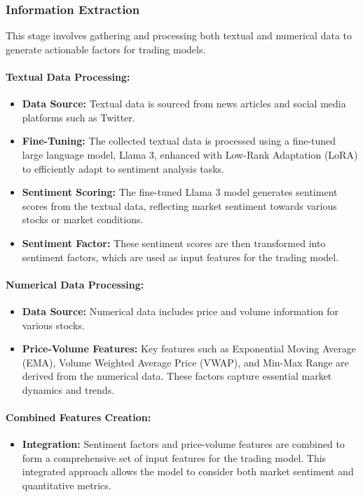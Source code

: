 \documentclass[conference]{IEEEtran}
\begin{document}
\subsubsection{Information Extraction}

This stage involves gathering and processing both textual and numerical data to generate actionable factors for trading models.

\paragraph{Textual Data Processing:}
\begin{itemize}
    \item \textbf{Data Source:} Textual data is sourced from news articles and social media platforms such as Twitter.
    \item \textbf{Fine-Tuning:} The collected textual data is processed using a fine-tuned large language model, Llama 3, enhanced with Low-Rank Adaptation (LoRA) to efficiently adapt to sentiment analysis tasks.
    \item \textbf{Sentiment Scoring:} The fine-tuned Llama 3 model generates sentiment scores from the textual data, reflecting market sentiment towards various stocks or market conditions.
    \item \textbf{Sentiment Factor:} These sentiment scores are then transformed into sentiment factors, which are used as input features for the trading model.
\end{itemize}

\paragraph{Numerical Data Processing:}
\begin{itemize}
    \item \textbf{Data Source:} Numerical data includes price and volume information for various stocks.
    \item \textbf{Price-Volume Features:} Key features such as Exponential Moving Average (EMA), Volume Weighted Average Price (VWAP), and Min-Max Range are derived from the numerical data. These factors capture essential market dynamics and trends.
\end{itemize}

\paragraph{Combined Features Creation:}
\begin{itemize}
    \item \textbf{Integration:} Sentiment factors and price-volume features are combined to form a comprehensive set of input features for the trading model. This integrated approach allows the model to consider both market sentiment and quantitative metrics.
\end{itemize}
\end{document}
